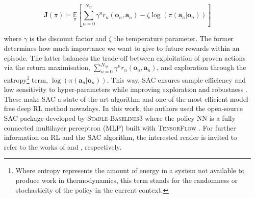 \begin{equation}
    \label{eq:SAC_objective}
    \bm{J}(\pi) = \underset{\pi}{\mathbb{E}}\left[\underset{n=0}{\overset{N_{ep}}{\sum}}\gamma^n r_n\left(\bm{o}_n,\bm{a}_n \right) - \zeta \log \left(\pi\left(\bm{a}_n | \bm{o}_n\right) \right) \right]
\end{equation}

\noindent
where $\gamma$ is the discount factor and $\zeta$ the temperature parameter. The former determines how much importance we want to give to future rewards within an episode. The latter balances the trade-off between exploitation of proven actions via the return maximisation, \ie $\sum_{n=0}^{N_{ep}}\gamma^n r_n\left(\bm{o}_n,\bm{a}_n \right)$, and exploration through the entropy\footnote{Where entropy represents the amount of energy in a system not available to produce work in thermodynamics, this term stands for the randomness or stochasticity of the policy in the current context.} term, \ie $\log \left(\pi\left(\bm{a}_n | \bm{o}_n\right) \right)$. This way, \gls{SAC} ensures sample efficiency and low sensitivity to hyper-parameters while improving exploration \cite{haarnoja2017reinforcement} and robustness \cite{ziebart2010modeling}. These make \gls{SAC} a state-of-the-art algorithm and one of the most efficient model-free deep RL method nowadays. In this work, the authors used the open-source \gls{SAC} package developed by \textsc{Stable-Baselines3} \cite{raffin2021stable} where the policy \gls{NN} is a fully connected multilayer perceptron (MLP) built with \textsc{TensorFlow} \cite{abadi2016tensorflow}. For further information on \gls{RL} and the \gls{SAC} algorithm, the interested reader is invited to refer to the works of \citet{sutton2018reinforcement} and \citet{haarnoja2018soft}, respectively.

